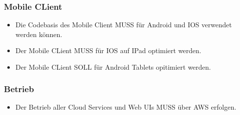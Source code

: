     \subsubsection*{Mobile CLient}

        \begin{itemize}
            \item Die Codebasis des Mobile Client MUSS für Android und IOS verwendet werden können.  
            \item Der Mobile CLient MUSS für IOS auf IPad optimiert werden.  
            \item Der Mobile CLient SOLL für Android Tablets opitimiert werden.  
        \end{itemize}

    \subsubsection*{Betrieb}

        \begin{itemize}
            \item Der Betrieb aller Cloud Services und Web UIs MUSS über AWS erfolgen. 
        \end{itemize}
